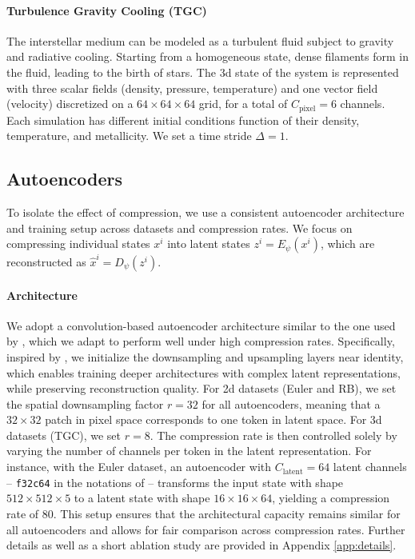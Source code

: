 \paragraph{Turbulence Gravity Cooling (TGC)} The interstellar medium can be modeled as a turbulent fluid subject to gravity and radiative cooling. Starting from a homogeneous state, dense filaments form in the fluid, leading to the birth of stars. The 3d state of the system is represented with three scalar fields (density, pressure, temperature) and one vector field (velocity) discretized on a $64 \times 64 \times 64$ grid, for a total of $C_\text{pixel} = 6$ channels. Each simulation has different initial conditions function of their density, temperature, and metallicity. We set a time stride $\Delta = 1$.

\subsection{Autoencoders}

To isolate the effect of compression, we use a consistent autoencoder architecture and training setup across datasets and compression rates. We focus on compressing individual states $x^i$ into latent states $z^i = E_\psi(x^i)$, which are reconstructed as $\hat{x}^i = D_\psi(z^i)$.

\paragraph{Architecture} We adopt a convolution-based autoencoder architecture similar to the one used by \textcite{rombach2022highresolution}, which we adapt to perform well under high compression rates. Specifically, inspired by \textcite{chen2025deep}, we initialize the downsampling and upsampling layers near identity, which enables training deeper architectures with complex latent representations, while preserving reconstruction quality. For 2d datasets (Euler and RB), we set the spatial downsampling factor $r = 32$ for all autoencoders, meaning that a $32 \times 32$ patch in pixel space corresponds to one token in latent space. For 3d datasets (TGC), we set $r = 8$. The compression rate is then controlled solely by varying the number of channels per token in the latent representation. For instance, with the Euler dataset, an autoencoder with $C_\text{latent} = 64$ latent channels -- \texttt{f32c64} in the notations of \textcite{chen2025deep} -- transforms the input state with shape $512 \times 512 \times 5$ to a latent state with shape $16 \times 16 \times 64$, yielding a compression rate of $80$. This setup ensures that the architectural capacity remains similar for all autoencoders and allows for fair comparison across compression rates. Further details as well as a short ablation study are provided in Appendix \ref{app:details}.

